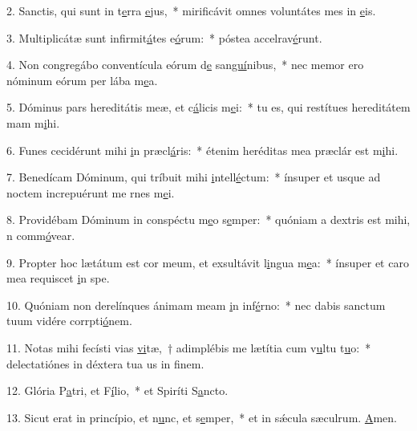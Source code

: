2. Sanctis, qui sunt in t\uline{e}rra \uline{e}jus,~* mirificávit omnes voluntátes mes in \uline{e}is.\par 
3. Multiplicátæ sunt infirmit\uline{á}tes e\uline{ó}rum:~* póstea accelrav\uline{é}runt.\par 
4. Non congregábo conventícula eórum d\uline{e} san\uline{guí}nibus,~* nec memor ero nóminum eórum per lába m\uline{e}a.\par 
5. Dóminus pars hereditátis meæ, et c\uline{á}licis m\uline{e}i:~* tu es, qui restítues hereditátem mam m\uline{i}hi.\par 
6. Funes cecidérunt mihi \uline{i}n præcl\uline{á}ris:~* étenim heréditas mea præclár est m\uline{i}hi.\par 
7. Benedícam Dóminum, qui tríbuit mihi \uline{i}ntell\uline{é}ctum:~* ínsuper et usque ad noctem increpuérunt me rnes m\uline{e}i.\par 
8. Providébam Dóminum in conspéctu m\uline{e}o s\uline{e}mper:~* quóniam a dextris est mihi, n comm\uline{ó}vear.\par 
9. Propter hoc lætátum est cor meum, et exsultávit l\uline{i}ngua m\uline{e}a:~* ínsuper et caro mea requiscet \uline{i}n spe.\par 
10. Quóniam non derelínques ánimam meam \uline{i}n inf\uline{é}rno:~* nec dabis sanctum tuum vidére corrpti\uline{ó}nem.\par 
11. Notas mihi fecísti vias \uline{vi}tæ,~† adimplébis me lætítia cum v\uline{u}ltu t\uline{u}o:~* delectatiónes in déxtera tua us in f\uline{i}nem.\par 
12. Glória P\uline{a}tri, et F\uline{í}lio,~* et Spiríti S\uline{a}ncto.\par 
13. Sicut erat in princípio, et n\uline{u}nc, et s\uline{e}mper,~* et in sǽcula sæculrum. \uline{A}men.\par 
